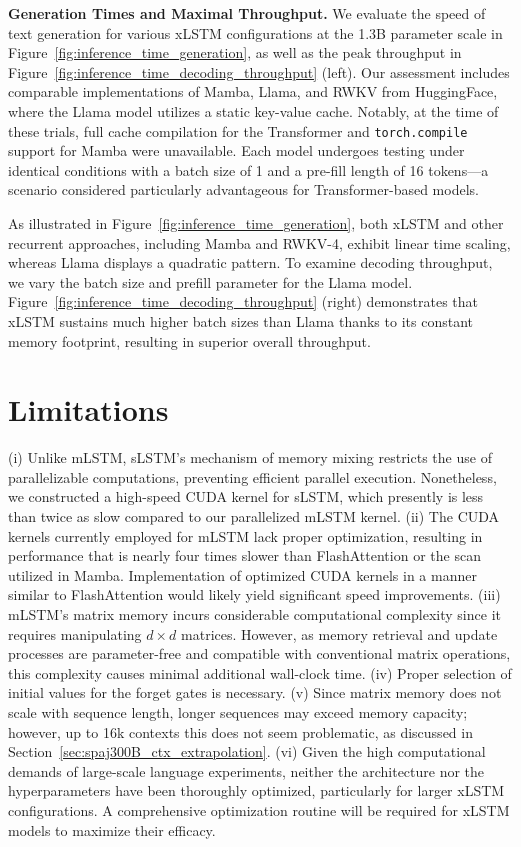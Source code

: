 \textbf{Generation Times and Maximal Throughput.} We evaluate the speed of text generation for various xLSTM configurations at the 1.3B parameter scale in Figure~\ref{fig:inference_time_generation}, as well as the peak throughput in Figure~\ref{fig:inference_time_decoding_throughput} (left). Our assessment includes comparable implementations of Mamba, Llama, and RWKV from HuggingFace, where the Llama model utilizes a static key-value cache. Notably, at the time of these trials, full cache compilation for the Transformer and \texttt{torch.compile} support for Mamba were unavailable. Each model undergoes testing under identical conditions with a batch size of 1 and a pre-fill length of 16 tokens—a scenario considered particularly advantageous for Transformer-based models.

As illustrated in Figure~\ref{fig:inference_time_generation}, both xLSTM and other recurrent approaches, including Mamba and RWKV-4, exhibit linear time scaling, whereas Llama displays a quadratic pattern. To examine decoding throughput, we vary the batch size and prefill parameter for the Llama model. Figure~\ref{fig:inference_time_decoding_throughput} (right) demonstrates that xLSTM sustains much higher batch sizes than Llama thanks to its constant memory footprint, resulting in superior overall throughput.

\section{Limitations}

(i) Unlike mLSTM, sLSTM’s mechanism of memory mixing restricts the use of parallelizable computations, preventing efficient parallel execution. Nonetheless, we constructed a high-speed CUDA kernel for sLSTM, which presently is less than twice as slow compared to our parallelized mLSTM kernel. (ii) The CUDA kernels currently employed for mLSTM lack proper optimization, resulting in performance that is nearly four times slower than FlashAttention or the scan utilized in Mamba. Implementation of optimized CUDA kernels in a manner similar to FlashAttention would likely yield significant speed improvements. (iii) mLSTM’s matrix memory incurs considerable computational complexity since it requires manipulating $d \times d$ matrices. However, as memory retrieval and update processes are parameter-free and compatible with conventional matrix operations, this complexity causes minimal additional wall-clock time. (iv) Proper selection of initial values for the forget gates is necessary. (v) Since matrix memory does not scale with sequence length, longer sequences may exceed memory capacity; however, up to 16k contexts this does not seem problematic, as discussed in Section~\ref{sec:spaj300B_ctx_extrapolation}. (vi) Given the high computational demands of large-scale language experiments, neither the architecture nor the hyperparameters have been thoroughly optimized, particularly for larger xLSTM configurations. A comprehensive optimization routine will be required for xLSTM models to maximize their efficacy.

